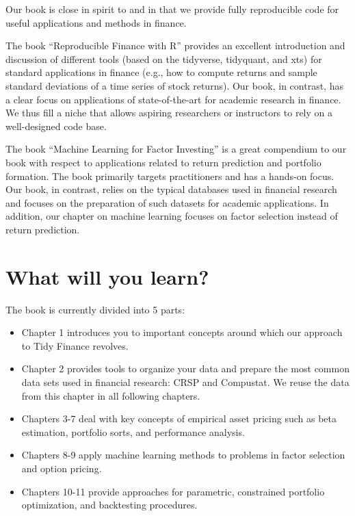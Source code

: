 \documentclass[
]{book}
\providecommand{\tightlist}{%
  \setlength{\itemsep}{0pt}\setlength{\parskip}{0pt}}
\begin{document}
Our book is close in spirit to \citet{Regenstein2018} and \citet{Coqueret2020} in that we provide fully reproducible code for useful applications and methods in finance.

The book ``Reproducible Finance with R'' provides an excellent introduction and discussion of different tools (based on the tidyverse, tidyquant, and xts) for standard applications in finance (e.g., how to compute returns and sample standard deviations of a time series of stock returns). Our book, in contrast, has a clear focus on applications of state-of-the-art for academic research in finance. We thus fill a niche that allows aspiring researchers or instructors to rely on a well-designed code base.

The book ``Machine Learning for Factor Investing'' is a great compendium to our book with respect to applications related to return prediction and portfolio formation. The book primarily targets practitioners and has a hands-on focus. Our book, in contrast, relies on the typical databases used in financial research and focuses on the preparation of such datasets for academic applications. In addition, our chapter on machine learning focuses on factor selection instead of return prediction.

\hypertarget{what-will-you-learn}{%
\section*{What will you learn?}\label{what-will-you-learn}}


The book is currently divided into 5 parts:

\begin{itemize}
\tightlist
\item
  Chapter 1 introduces you to important concepts around which our approach to Tidy Finance revolves.
\item
  Chapter 2 provides tools to organize your data and prepare the most common data sets used in financial research: CRSP and Compustat. We reuse the data from this chapter in all following chapters.
\item
  Chapters 3-7 deal with key concepts of empirical asset pricing such as beta estimation, portfolio sorts, and performance analysis.
\item
  Chapters 8-9 apply machine learning methods to problems in factor selection and option pricing.
\item
  Chapters 10-11 provide approaches for parametric, constrained portfolio optimization, and backtesting procedures.
\end{itemize}
\end{document}
